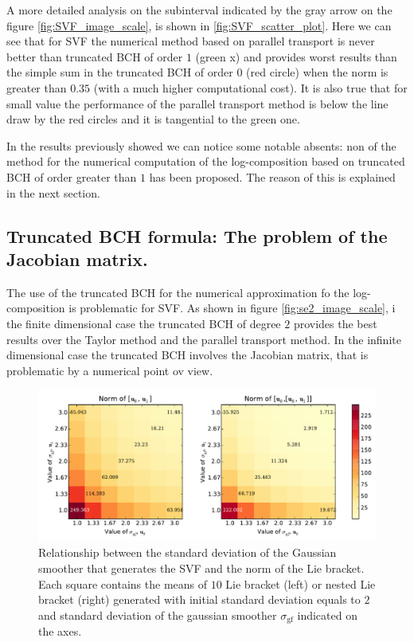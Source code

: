 A more detailed analysis on the subinterval indicated by the gray arrow on the figure \ref{fig:SVF_image_scale}, is shown in \ref{fig:SVF_scatter_plot}.
Here we can see that for SVF the numerical method based on parallel transport is never better than  truncated BCH of order $1$ (green x) and provides worst results than the simple sum in the truncated BCH of order $0$ (red circle) when the norm is greater than $0.35$ (with a much higher computational cost). It is also true that for small value the performance of the parallel transport method is below the line draw by the red circles and it is tangential to the green one.

In the results previously showed we can notice some notable absents: non of the method for the numerical computation of the log-composition based on truncated BCH of order greater than $1$ has been proposed. The reason of this is explained in the next section.


\subsection{Truncated BCH formula: The problem of the Jacobian matrix.}\label{se:jacobian_problem}

The use of the truncated BCH for the numerical approximation fo the log-composition is problematic for SVF. As shown in figure \ref{fig:se2_image_scale}, i the finite dimensional case the truncated BCH of degree $2$ provides the best results over the Taylor method and the parallel transport method. In the infinite dimensional case the truncated BCH involves the Jacobian matrix, that is problematic by a numerical point ov view.

\begin{figure}[!ht]
	\hspace{0cm}
	\includegraphics[scale=0.5]{figures/SVF_image_scale_bracket_versus_gaussian.pdf}
	\caption{Relationship between the standard deviation of the Gaussian smoother that generates the SVF and the norm of the Lie bracket. Each square contains the means of $10$ Lie bracket (left) or nested Lie bracket (right) generated with initial standard deviation equals to $2$ and standard deviation of the gaussian smoother $\sigma_{\text{gf}}$ indicated on the axes.}
	\label{fig:SVF_image_scale_bracket_versus_gaussian}
\end{figure}

